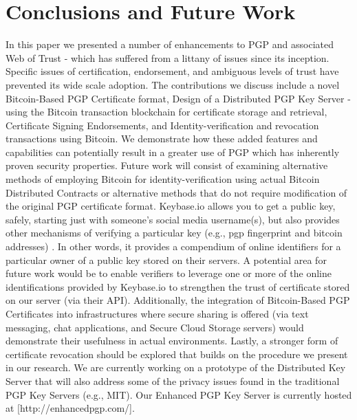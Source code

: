 \documentclass{llncs}
\begin{document}
\section{Conclusions and Future Work}
In this paper we presented a number of enhancements to PGP and associated Web of Trust - which has suffered from a littany of issues since its inception.  Specific issues of certification, endorsement, and ambiguous levels of trust have prevented its wide scale adoption.  The contributions we discuss include a novel Bitcoin-Based PGP Certificate format, Design of a Distributed PGP Key Server - using the Bitcoin transaction blockchain for certificate storage and retrieval, Certificate Signing Endorsements, and Identity-verification and revocation transactions using Bitcoin.  We demonstrate how these added features and capabilities can potentially result in a greater use of PGP which has inherently proven security properties.  Future work will consist of examining alternative methods of employing Bitcoin for identity-verification using actual Bitcoin Distributed Contracts or alternative methods that do not require modification of the original PGP certificate format.  Keybase.io allows you to get a public key, safely, starting just with someone's social media username(s), but also provides other mechanisms of verifying a particular key (e.g., pgp fingerprint and bitcoin addresses) \cite{keybase}.  In other words, it provides a compendium of online identifiers for a particular owner of a public key stored on their servers.  A potential area for future work would be to enable verifiers to leverage one or more of the online identifications provided by Keybase.io to strengthen the trust of certificate stored on our server (via their API).  Additionally, the integration of Bitcoin-Based PGP Certificates into infrastructures where secure sharing is offered (via text messaging, chat applications, and Secure Cloud Storage servers) would demonstrate their usefulness in actual environments.  Lastly, a stronger form of certificate revocation should be explored that builds on the procedure we present in our research.  We are currently working on a prototype of the Distributed Key Server that will also address some of the privacy issues found in the traditional PGP Key Servers (e.g., MIT).  Our Enhanced PGP Key Server is currently hosted at [http://enhancedpgp.com/].    
\end{document}

